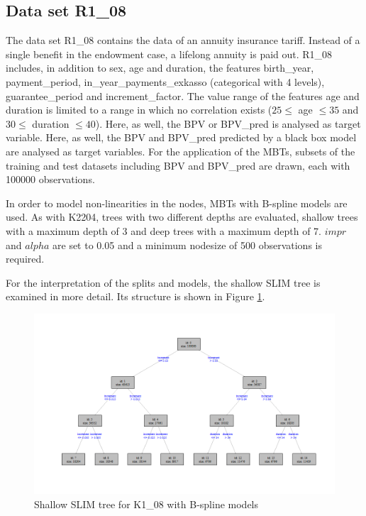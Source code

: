 \subsection{Data set R1\_08}

The data set R1\_08 contains the data of an annuity insurance tariff. Instead of a single benefit in the endowment case, a lifelong annuity is paid out.
R1\_08 includes, in addition to sex, age and duration, the features birth\_year, payment\_period, in\_year\_payments\_exkasso (categorical with 4 levels), guarantee\_period and increment\_factor.
The value range of the features age and duration is limited to a range in which no correlation exists ($25 \leq$ age $\leq 35$ and $30 \leq$ duration $\leq 40$).
Here, as well, the BPV or BPV\_pred is analysed as target variable. Here, as well, the BPV and BPV\_pred predicted by a black box model are analysed as target variables.
For the application of the MBTs, subsets of the training and test datasets including BPV and BPV\_pred are drawn, each with 100000 observations.

In order to model non-linearities in the nodes, MBTs with B-spline models are used. As with K2204, trees with two different depths are evaluated, shallow trees with a maximum depth of 3 and deep trees with a maximum depth of 7. $impr$ and $alpha$ are set to 0.05 and a minimum nodesize of 500 observations is required.

For the interpretation of the splits and models, the shallow SLIM tree is examined in more detail. Its structure is shown in Figure \ref{fig:ins_k108_slim_bsplines_small_tree}.

\begin{figure}[!htb]
    \centering
    \includegraphics[width = 16cm]{Figures/insurance_use_case/k1_08_BPV/slim_bsplines_small_tree.png}
    \caption{Shallow SLIM tree for K1\_08 with B-spline models}
    \label{fig:ins_k108_slim_bsplines_small_tree}
\end{figure}

